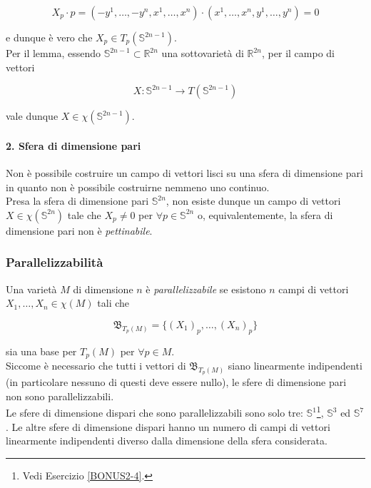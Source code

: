 \begin{equation}
	X_{p} \cdot p = (-y^{1},\dots,-y^{n},x^{1},\dots,x^{n}) \cdot (x^{1},\dots,x^{n},y^{1},\dots,y^{n}) = 0
\end{equation}

e dunque è vero che $ X_{p} \in T_{p}(\mathbb{S}^{2n-1}) $.\\
Per il lemma, essendo $ \mathbb{S}^{2n-1} \subset \mathbb{R}^{2n} $ una sottovarietà di $ \mathbb{R}^{2n} $, per il campo di vettori

\begin{equation}
	X : \mathbb{S}^{2n-1} \to T(\mathbb{S}^{2n-1})
\end{equation}

vale dunque $ X \in \chi(\mathbb{S}^{2n-1}) $.

\paragraph{2. Sfera di dimensione pari}

Non è possibile costruire un campo di vettori lisci su una sfera di dimensione pari in quanto non è possibile costruirne nemmeno uno continuo.\\
Presa la sfera di dimensione pari $ \mathbb{S}^{2n} $, non esiste dunque un campo di vettori $ X \in \chi(\mathbb{S}^{2n}) $ tale che $ X_{p} \neq 0 $ per $ \forall p \in \mathbb{S}^{2n} $ o, equivalentemente, la sfera di dimensione pari non è \textit{pettinabile}.

\subsubsection{Parallelizzabilità}

Una varietà $ M $ di dimensione $ n $ è \textit{parallelizzabile} se esistono $ n $ campi di vettori $ X_{1},\dots,X_{n} \in \chi(M) $ tali che

\begin{equation}
	\mathfrak{B}_{T_{p}(M)} = \{ (X_{1})_{p},\dots,(X_{n})_{p} \}
\end{equation}

sia una base per $ T_{p}(M) $ per $ \forall p \in M $.\\
Siccome è necessario che tutti i vettori di $ \mathfrak{B}_{T_{p}(M)} $ siano linearmente indipendenti (in particolare nessuno di questi deve essere nullo), le sfere di dimensione pari non sono parallelizzabili.\\
Le sfere di dimensione dispari che sono parallelizzabili sono solo tre: $ \mathbb{S}^{1} $\footnote{%
	Vedi Esercizio \ref{BONUS2-4}.%
}, $ \mathbb{S}^{3} $ ed $ \mathbb{S}^{7} $. Le altre sfere di dimensione dispari hanno un numero di campi di vettori linearmente indipendenti diverso dalla dimensione della sfera considerata.


